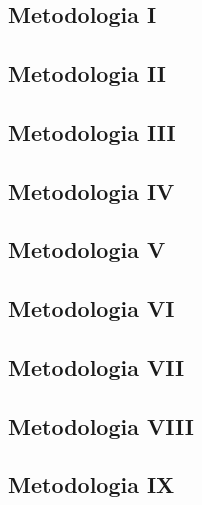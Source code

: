 \chapter{}
\section{Metodologia I}

\clearpage

\section{Metodologia II}

\clearpage

\section{Metodologia III}
 
\clearpage

\section{Metodologia IV}

\clearpage

\section{Metodologia V}

\clearpage

\section{Metodologia VI}

\clearpage

\section{Metodologia VII}

\clearpage

\section{Metodologia VIII}

\clearpage

\section{Metodologia IX}

\clearpage

